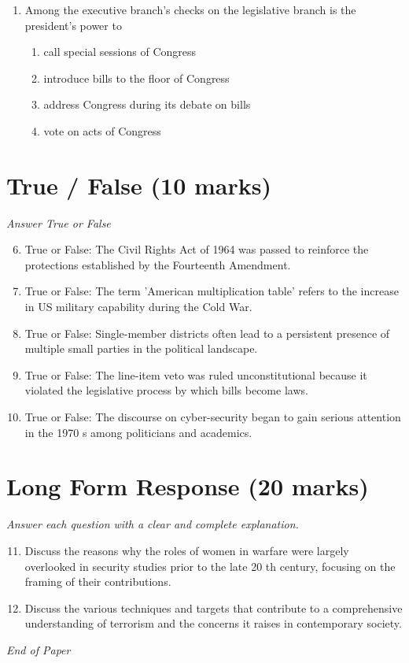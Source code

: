 \documentclass[12pt]{article}
\begin{document}
\begin{enumerate}[label=\arabic*.]
\begin{enumerate}[label=(\alph*)]
    \item A corrupted program
\end{enumerate}
\item Among the executive branch's checks on the legislative branch is the president's power to
\begin{enumerate}[label=(\alph*)]
    \item call special sessions of Congress
    \item introduce bills to the floor of Congress
    \item address Congress during its debate on bills
    \item vote on acts of Congress
\end{enumerate}
\end{enumerate}

\section*{True / False (10 marks)}
\textit{Answer True or False}
\begin{enumerate}[label=\arabic*.]
\setcounter{enumi}{5}
\item True or False: The Civil Rights Act of 1964 was passed to reinforce the protections established by the Fourteenth Amendment.
\item True or False: The term 'American multiplication table' refers to the increase in US military capability during the Cold War.
\item True or False: Single-member districts often lead to a persistent presence of multiple small parties in the political landscape.
\item True or False: The line-item veto was ruled unconstitutional because it violated the legislative process by which bills become laws.
\item True or False: The discourse on cyber-security began to gain serious attention in the 1970 s among politicians and academics.
\end{enumerate}

\section*{Long Form Response (20 marks)}
\textit{Answer each question with a clear and complete explanation.}
\begin{enumerate}[label=\arabic*.]
\setcounter{enumi}{10}
\item Discuss the reasons why the roles of women in warfare were largely overlooked in security studies prior to the late 20 th century, focusing on the framing of their contributions.
\item Discuss the various techniques and targets that contribute to a comprehensive understanding of terrorism and the concerns it raises in contemporary society.
\end{enumerate}

\vfill
\noindent\textit{End of Paper}
\end{document}
